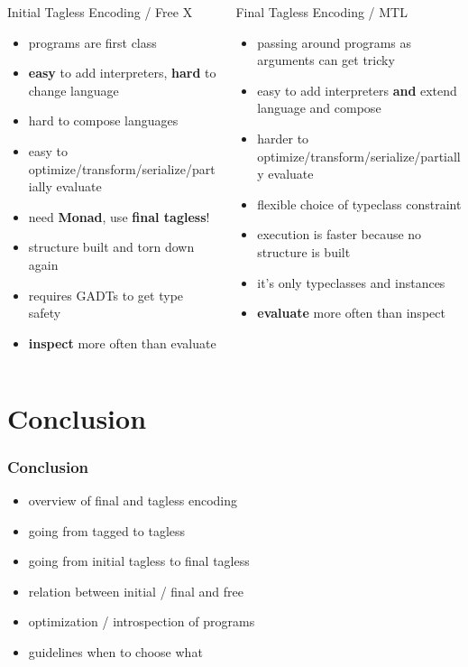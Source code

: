 \documentclass[aspectratio=169, hyperref={colorlinks, linkcolor=beamer@centricgreen}, urlcolor=links]{beamer}
\begin{document}
\begin{frame}[t]
  \small{}
  \begin{columns}
    \begin{column}{0.5\textwidth}
      Initial Tagless Encoding / Free X
      \begin{itemize}
      \item programs are first class
      \item \textbf{easy} to add interpreters, \textbf{hard} to change language
      \item hard to compose languages
      \item easy to optimize/transform/serialize/partially evaluate
      \item need \textbf{Monad}, use \textbf{final tagless}!
      \item structure built and torn down again
      \item requires GADTs to get type safety
      \item \textbf{inspect} more often than evaluate
      \end{itemize}
    \end{column}
    \begin{column}{0.5\textwidth}
      Final Tagless Encoding / MTL
      \begin{itemize}
      \item passing around programs as arguments can get tricky
      \item easy to add interpreters \textbf{and} extend language and compose
      \item harder to optimize/transform/serialize/partially evaluate
      \item flexible choice of typeclass constraint
      \item execution is faster because no structure is built
      \item it's only typeclasses and instances
      \item \textbf{evaluate} more often than inspect
      \end{itemize}
    \end{column}
  \end{columns}
\end{frame}

\section{Conclusion}\label{sec:conclusion}

\begin{frame}
  \frametitle{Conclusion}
  \begin{itemize}
  \item overview of final and tagless encoding
  \item going from tagged to tagless
  \item going from initial tagless to final tagless
  \item relation between initial / final and free
  \item optimization / introspection of programs
  \item guidelines when to choose what
  \end{itemize}
\end{frame}
\end{document}
